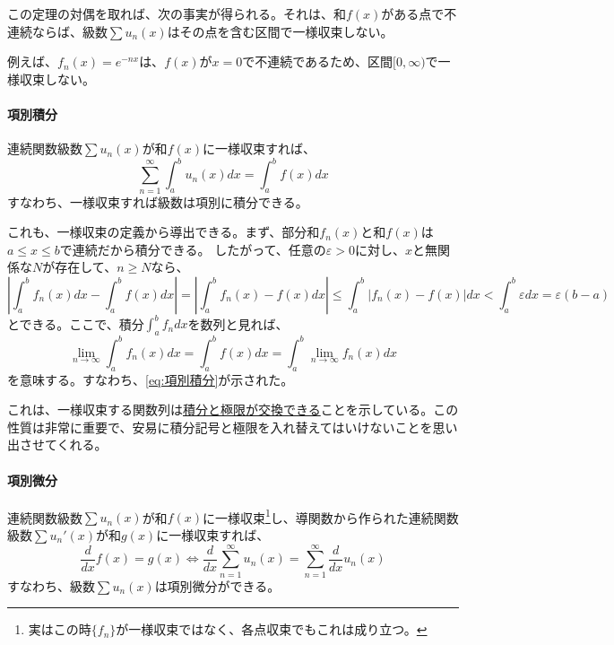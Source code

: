 \documentclass[a4j,dvipdfmx]{jsarticle}
\begin{document}
                この定理の対偶を取れば、次の事実が得られる。それは、和$f(x)$がある点で不連続ならば、級数$\sum u_n(x)$はその点を含む区間で一様収束しない。

                例えば、$f_n(x)=e^{-nx}$は、$f(x)$が$x=0$で不連続であるため、区間$[0,\infty)$で一様収束しない。
                \clearpage
                \paragraph{項別積分}連続関数級数$\sum u_n(x)$が和$f(x)$に一様収束すれば、
                \begin{equation}
                    \sum_{n=1}^{\infty}\int_{a}^{b}u_n(x)dx = \int_a^b f(x)dx \label{eq:項別積分}
                \end{equation}
                すなわち、一様収束すれば級数は項別に積分できる。

                これも、一様収束の定義から導出できる。まず、部分和$f_n(x)$と和$f(x)$は$a\leq x\leq b$で連続だから積分できる。
                したがって、任意の$\varepsilon>0$に対し、$x$と無関係な$N$が存在して、$n\geq N$なら、
                \begin{equation*}
                    \left|\int_{a}^{b}f_n(x)dx -\int_a^b f(x)dx\right|=\left|\int_{a}^{b}f_n(x)-f(x)dx\right|\leq \int_{a}^{b}|f_n(x)-f(x)|dx<\int_{a}^{b}\varepsilon dx=\varepsilon(b-a)
                \end{equation*}
                とできる。ここで、積分$\int_{a}^{b}f_ndx$を数列と見れば、
                \begin{equation*}
                    \lim_{n\to\infty}\int_{a}^{b}f_n(x)dx = \int_{a}^{b}f(x)dx=\int_{a}^{b}\lim_{n\to \infty}f_n(x)dx
                \end{equation*}
                を意味する。すなわち、\eqref{eq:項別積分}が示された。

                これは、一様収束する関数列は\underline{積分と極限が交換できる}ことを示している。この性質は非常に重要で、安易に積分記号と極限を入れ替えてはいけないことを思い出させてくれる。

                \paragraph{項別微分}連続関数級数$\sum u_n(x)$が和$f(x)$に一様収束\footnote{実はこの時$\{f_n\}$が一様収束ではなく、各点収束でもこれは成り立つ。}し、導関数から作られた連続関数級数$\sum u_n'(x)$が和$g(x)$に一様収束すれば、
                \begin{equation}
                    \frac{d}{dx}f(x)=g(x) \Leftrightarrow \frac{d}{dx}\sum_{n=1}^{\infty}u_n(x)=\sum_{n=1}^{\infty}\frac{d}{dx}u_n(x) \label{eq:項別微分}
                \end{equation}
                すなわち、級数$\sum u_n(x)$は項別微分ができる。
\end{document}
